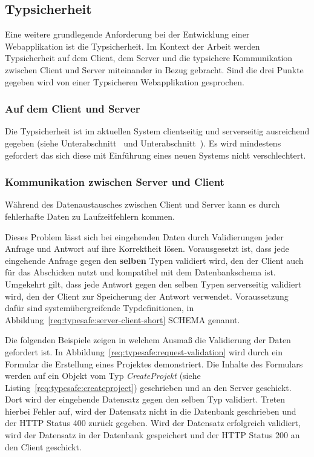 \subsection{Typsicherheit}
\label{req:typesafe}
Eine weitere grundlegende Anforderung bei der Entwicklung einer Webapplikation ist die Typsicherheit.
Im Kontext der Arbeit werden Typsicherheit auf dem Client,
dem Server und die typsichere Kommunikation zwischen Client und Server miteinander in Bezug gebracht.
Sind die drei Punkte gegeben wird von einer Typsicheren Webapplikation gesprochen.

\subsubsection{Auf dem Client und Server}
\label{req:typesafe:client}
Die Typsicherheit ist im aktuellen System clientseitig und serverseitig ausreichend gegeben (siehe Unterabschnitt~ und Unterabschnitt~).
Es wird mindestens gefordert das sich diese mit Einführung eines neuen Systems nicht verschlechtert.

\subsubsection{Kommunikation zwischen Server und Client}
\label{req:typesafe:api}
Während des Datenaustausches zwischen Client und Server kann es durch fehlerhafte Daten zu Laufzeitfehlern kommen.

Dieses Problem lässt sich bei eingehenden Daten durch Validierungen jeder Anfrage und Antwort auf ihre Korrektheit lösen.
Vorausgesetzt ist, dass jede eingehende Anfrage gegen den \textbf{selben} Typen validiert wird,
den der Client auch für das Abschicken nutzt und kompatibel mit dem Datenbankschema ist.
Umgekehrt gilt, dass jede Antwort gegen den selben Typen serverseitig validiert wird, den der Client zur Speicherung der Antwort verwendet.
Voraussetzung dafür sind systemübergreifende Typdefinitionen, in Abbildung~\ref{req:typesafe:server-client-short} SCHEMA genannt.

Die folgenden Beispiele zeigen in welchem Ausmaß die Validierung der Daten gefordert ist. In Abbildung~\ref{req:typesafe:request-validation} wird durch ein Formular die Erstellung eines Projektes demonstriert. Die Inhalte des Formulars werden auf ein Objekt vom Typ \emph{CreateProjekt} (siehe Listing~\ref{req:typesafe:createproject}) geschrieben und an den Server geschickt. Dort wird der eingehende Datensatz gegen den selben Typ validiert. Treten hierbei Fehler auf, wird der Datensatz nicht in die Datenbank geschrieben und der HTTP Status 400 zurück gegeben.
Wird der Datensatz erfolgreich validiert, wird der Datensatz in der Datenbank gespeichert und der HTTP Status 200 an den Client geschickt.

